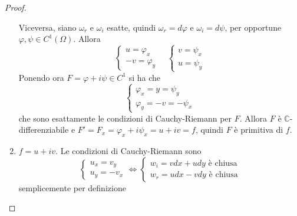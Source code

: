 \begin{proof}
\begin{enumerate}[label = \alph*)]
        Viceversa, siano \(\omega_{r}\) e \(\omega_{i}\) esatte, quindi
        \(\omega_r = d\varphi \) e \(\omega_{i} = d\psi\), per opportune
        \(\varphi , \psi \in C^{1}(\Omega)\). Allora 
        \[
            \begin{cases}
                u = \varphi _x \\
                -v = \varphi_y
            \end{cases}
            \quad
            \begin{cases}
                v = \psi_x \\
                u = \psi_y
            \end{cases}
        \]
        Ponendo ora \(F = \varphi + i\psi \in C^{1}\) si ha che 
        \[
            \begin{cases}
                \varphi_x = y = \psi_y \\ 
                \varphi_y = -v = -\psi_x
            \end{cases}
        \]
        che sono esattamente le condizioni di Cauchy-Riemann per \(F\). Allora
        \(F\) è \(\mathbb{C}\)-differenziabile e \(F' = F_x = \varphi_x +
        i\psi_x = u + iv = f\), quindi \(F\) è primitiva di \(f\).
    \item \(f = u + iv\). Le condizioni di Cauchy-Riemann sono 
        \[
            \begin{cases}
                u_x = v_y \\
                u_y = -v_x
            \end{cases}
            \iff 
            \begin{cases}
                w_{i} = vdx + udy \text{ è chiusa} \\
                w_{r} = udx - vdy \text{ è chiusa}
            \end{cases}
        \]
        semplicemente per definizione
\end{enumerate}
\end{proof}

